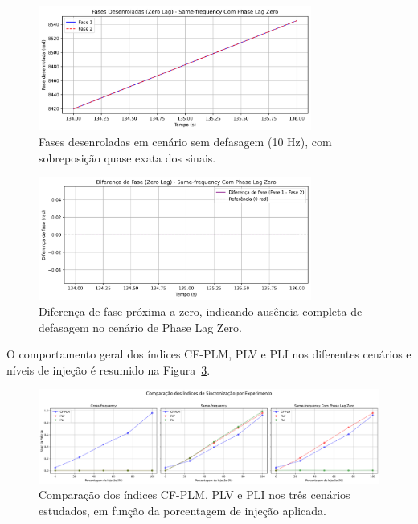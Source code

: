 \begin{figure}[htb]
    \centering
    \includegraphics[width=0.8\textwidth]{figs/3_2_testing_connectivity_metrics/15_ZeroLag_Fases_Same-frequency Com Phase Lag Zero.png}
    \caption{Fases desenroladas em cenário sem defasagem (10 Hz), com sobreposição quase exata dos sinais.}
    \label{fig:zerolag_phases_final}
\end{figure}

\begin{figure}[htb]
    \centering
    \includegraphics[width=0.8\textwidth]{figs/3_2_testing_connectivity_metrics/16_ZeroLag_Diferenca_Fase_Same-frequency Com Phase Lag Zero.png}
    \caption{Diferença de fase próxima a zero, indicando ausência completa de defasagem no cenário de Phase Lag Zero.}
    \label{fig:zerolag_difference_final}
\end{figure}

O comportamento geral dos índices CF-PLM, PLV e PLI nos diferentes cenários e níveis de injeção é resumido na Figura~\ref{fig:comparativo_metricas}.

\begin{figure}[htb]
    \centering
    \includegraphics[width=\textwidth]{figs/3_2_testing_connectivity_metrics/17_Comparativo_Subplots_Experimentos.png}
    \caption{Comparação dos índices CF-PLM, PLV e PLI nos três cenários estudados, em função da porcentagem de injeção aplicada.}
    \label{fig:comparativo_metricas}
\end{figure}

